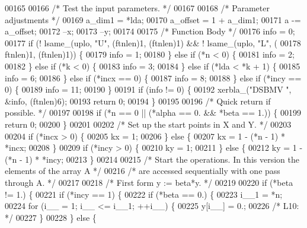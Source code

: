 \begin{DoxyCode}
00165 
00166 \textcolor{comment}{/*     Test the input parameters. */}
00167 
00168     \textcolor{comment}{/* Parameter adjustments */}
00169     a\_dim1 = *lda;
00170     a\_offset = 1 + a\_dim1;
00171     a -= a\_offset;
00172     --x;
00173     --y;
00174 
00175     \textcolor{comment}{/* Function Body */}
00176     info = 0;
00177     \textcolor{keywordflow}{if} (! lsame\_(uplo, \textcolor{stringliteral}{"U"}, (ftnlen)1, (ftnlen)1) && ! lsame\_(uplo, \textcolor{stringliteral}{"L"}, (
00178         ftnlen)1, (ftnlen)1)) \{
00179     info = 1;
00180     \} \textcolor{keywordflow}{else} \textcolor{keywordflow}{if} (*n < 0) \{
00181     info = 2;
00182     \} \textcolor{keywordflow}{else} \textcolor{keywordflow}{if} (*k < 0) \{
00183     info = 3;
00184     \} \textcolor{keywordflow}{else} \textcolor{keywordflow}{if} (*lda < *k + 1) \{
00185     info = 6;
00186     \} \textcolor{keywordflow}{else} \textcolor{keywordflow}{if} (*incx == 0) \{
00187     info = 8;
00188     \} \textcolor{keywordflow}{else} \textcolor{keywordflow}{if} (*incy == 0) \{
00189     info = 11;
00190     \}
00191     \textcolor{keywordflow}{if} (info != 0) \{
00192     xerbla\_(\textcolor{stringliteral}{"DSBMV "}, &info, (ftnlen)6);
00193     \textcolor{keywordflow}{return} 0;
00194     \}
00195 
00196 \textcolor{comment}{/*     Quick return if possible. */}
00197 
00198     \textcolor{keywordflow}{if} (*n == 0 || (*alpha == 0. && *beta == 1.)) \{
00199     \textcolor{keywordflow}{return} 0;
00200     \}
00201 
00202 \textcolor{comment}{/*     Set up the start points in  X  and  Y. */}
00203 
00204     \textcolor{keywordflow}{if} (*incx > 0) \{
00205     kx = 1;
00206     \} \textcolor{keywordflow}{else} \{
00207     kx = 1 - (*n - 1) * *incx;
00208     \}
00209     \textcolor{keywordflow}{if} (*incy > 0) \{
00210     ky = 1;
00211     \} \textcolor{keywordflow}{else} \{
00212     ky = 1 - (*n - 1) * *incy;
00213     \}
00214 
00215 \textcolor{comment}{/*     Start the operations. In this version the elements of the array A */}
00216 \textcolor{comment}{/*     are accessed sequentially with one pass through A. */}
00217 
00218 \textcolor{comment}{/*     First form  y := beta*y. */}
00219 
00220     \textcolor{keywordflow}{if} (*beta != 1.) \{
00221     \textcolor{keywordflow}{if} (*incy == 1) \{
00222         \textcolor{keywordflow}{if} (*beta == 0.) \{
00223         i\_\_1 = *n;
00224         \textcolor{keywordflow}{for} (i\_\_ = 1; i\_\_ <= i\_\_1; ++i\_\_) \{
00225             y[i\_\_] = 0.;
00226 \textcolor{comment}{/* L10: */}
00227         \}
00228         \} \textcolor{keywordflow}{else} \{

\end{DoxyCode}
